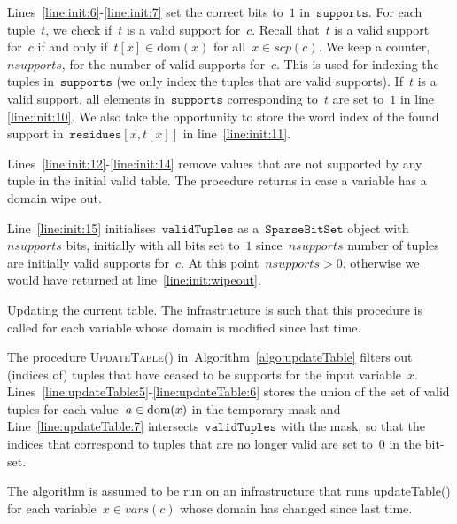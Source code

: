 \documentclass[a4paper,11pt]{article}
\newcommand{\Algoref}[1]{Algorithm~\ref{#1}}
\newcommand{\Lineref}[1]{Line~\ref{#1}}
\newcommand{\Linesref}[2]{Lines~\ref{#1}-\ref{#2}}
\newcommand{\Dom}[1]{\text{dom}({#1})}
\newcommand{\SparseBitSet}{\texttt{SparseBitSet}}
\newcommand{\CurrTable}{\texttt{validTuples}}
\newcommand{\Supports}{\texttt{supports}}
\newcommand{\Residues}{\texttt{residues}}
\def\UpdateTable{\textsc{UpdateTable}}
\newcommand{\localvar}[1]{\mathit{#1}}
\numberwithin{equation}{section}
\begin{document}
\Linesref{line:init:6}{line:init:7} set the correct bits to~$1$ in~$\Supports$.
For each tuple~$t$, we check if~$t$ is a valid support for~$c$. Recall that~$t$ is
a valid support for~$c$ if and only if~$t[x] \in \Dom{x}$ for all~$x \in scp(c)$.
We keep a counter,~$nsupports$, for the number of valid supports for~$c$.
This is used for indexing the tuples in~$\Supports$ (we only index the tuples
that are valid supports).
If~$t$ is a valid support,
all elements in~$\Supports$ corresponding to~$t$ are set to~$1$ in
line \ref{line:init:10}. We also take the opportunity to store the word index
of the found support in~$\Residues[x,t[x]]$
in line~\ref{line:init:11}.

\Linesref{line:init:12}{line:init:14} remove values that are not supported
by any tuple in the initial valid table. The procedure returns in case a variable
has a domain wipe out.

\Lineref{line:init:15} initialises~$\CurrTable$ as a~$\SparseBitSet$ object with
$nsupports$ bits, initially with all bits set to~$1$ since~$nsupports$
number of tuples are initially valid supports for~$c$.
At this point~$\localvar{nsupports} > 0$,
otherwise we would have returned at line~\ref{line:init:wipeout}.

  \begin{algorithm}[H]
  \begin{algorithmic}[1]  %
    
  \end{algorithmic}
  \caption{Updating the current table. The infrastructure
  is such that this procedure is called for each variable whose domain is
  modified since last time.}
  \label{algo:updateTable}
\end{algorithm}

  The procedure \UpdateTable() in~\Algoref{algo:updateTable}
  filters out (indices of)
  tuples that have ceased to be supports for the input variable~$x$.
  \Linesref{line:updateTable:5}{line:updateTable:6} stores the union of the
  set of valid tuples for each value~$a \in \text{dom}(x)$ in the temporary mask
  and \Lineref{line:updateTable:7} intersects~$\CurrTable$ with the mask,
  so that the indices that correspond to tuples that are no longer valid
  are set to~$0$ in the bit-set.

  The algorithm is assumed to be run on an infrastructure that runs updateTable()
  for each variable~$x \in vars(c)$ whose domain has changed since last time.
  
\end{document}
